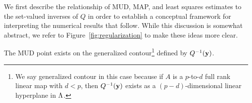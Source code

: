 


We first describe the relationship of MUD, MAP, and least squares estimates to the set-valued inverses of $Q$ in order to establish a conceptual framework for interpreting the numerical results that follow.
While this discussion is somewhat abstract, we refer to Figure~\ref{fig:regularization} to make these ideas more clear.

The MUD point exists on the generalized contour\footnote{We say generalized contour in this case because if $A$ is a $p$-to-$d$ full rank linear map with $d<p$, then $Q^{-1}(\mathbf{y})$ exists as a $(p-d)$-dimensional linear hyperplane in ${\Lambda}$.} defined by $Q^{-1}(\mathbf{y})$.

